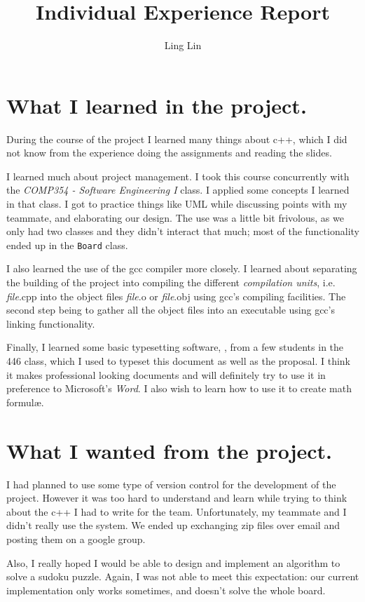 \documentclass[12pt]{article}
\author{Ling Lin}
\title{Individual Experience Report}
\begin{document}
\maketitle

\section{What I learned in the project.}
During the course of the project I learned many things about c++, which I did
not know from the experience doing the assignments and reading the slides.


I learned much about project management.  I took this course concurrently with
the \emph{COMP354 - Software Engineering I} class.  I applied some concepts I
learned in that class.  I got to practice things like UML while discussing
points with my teammate, and elaborating our design.  The use was a little bit
frivolous, as we only had two classes and they didn't interact that much; most
of the functionality ended up in the \texttt{Board} class.

I also learned the use of the gcc compiler more closely.  I learned about
separating the building of the project into compiling the different
\emph{compilation units}, i.e. \textit{file}.cpp into the object files
\textit{file}.o or \textit{file}.obj using gcc's compiling facilities.  The
second step being to gather all the object files into an executable using gcc's
linking functionality.

Finally, I learned some basic typesetting software, \LaTeXe, from a few
students in the 446 class, which I used to typeset this document as well as the
proposal.  I think it makes professional looking documents and will definitely
try to use it in preference to Microsoft's \emph{Word}. I also wish to learn
how to use it to create math formul\ae.

\section{What I wanted from the project.}
I had planned to use some type of version control for the development of the
project.  However it was too hard to understand and learn while trying to think
about the c++ I had to write for the team.  Unfortunately, my teammate and I
didn't really use the system.  We ended up exchanging zip files over email and
posting them on a google group.

Also, I really hoped I would be able to design and implement an algorithm to
solve a sudoku puzzle.  Again, I was not able to meet this expectation: our
current implementation only works sometimes, and doesn't solve the whole board.
\end{document}
